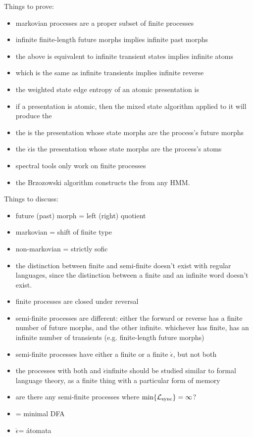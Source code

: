 \documentclass[prl,twocolumn,showpacs,superscriptaddress,preprintnumbers,floatfix]{revtex4-1}
\newcommand{\etomata}{\ensuremath{\acute{\epsilon}}\text{tomata}}
\begin{document}
Things to prove:
\begin{itemize}
  \item markovian processes are a proper subset of finite processes
  \item infinite finite-length future morphs implies infinite past morphs
  \item the above is equivalent to infinite transient states implies infinite
    atoms
  \item which is the same as infinite transients implies infinite reverse \eM
  \item the weighted state edge entropy of an atomic presentation is \hmu
  \item if a presentation is atomic, then the mixed state algorithm applied to
    it will produce the \eM
  \item the \eM is the presentation whose state morphs are the process's future
    morphs
  \item the \etomata is the presentation whose state morphs are the process's atoms
  \item spectral tools only work on finite processes
  \item the Brzozowski algorithm constructs the \eM from any HMM.
\end{itemize}

Things to discuss:
\begin{itemize}
  \item future (past) morph = left (right) quotient
  \item markovian = shift of finite type
  \item non-markovian = strictly sofic
  \item the distinction between finite and semi-finite doesn't exist with
    regular languages, since the distinction between a finite and an infinite
    word doesn't exist.
  \item finite processes are closed under reversal
  \item semi-finite processes are different: either the forward or reverse has a
    finite number of future morphs, and the other infinite. whichever has
    finite, has an infinite number of transients (e.g. finite-length future morphs)
  \item semi-finite processes have either a finite \eM or a finite \etomata, but not both
  \item the processes with both \eM and \etomata infinite should be studied similar
    to formal language theory, as a finite thing with a particular form of
    memory
  \item are there any semi-finite processes where $\min\{\mathcal{L}_{\mathrm{sync}}\} = \infty$?
  \item \eM = minimal DFA
  \item \etomata = {\'a}tomata
\end{itemize}
\end{document}
